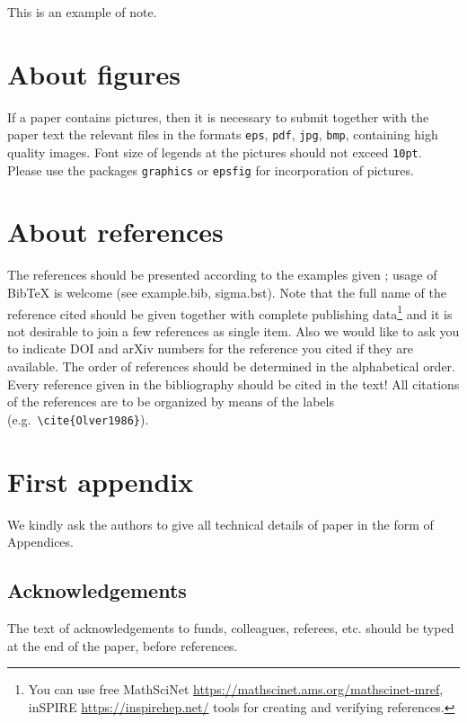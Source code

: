 \documentclass[pdftex]{sigma}
\numberwithin{equation}{section}
\begin{document}
\begin{Note}\label{note1}
This is an example of note.
\end{Note}


\section{About figures}

If a paper contains pictures, then it is necessary to submit together with
the paper text the relevant files in the formats {\tt eps}, {\tt pdf}, {\tt jpg}, {\tt bmp}, containing high quality images.
Font size of legends at the pictures should not exceed {\tt 10pt}.
Please use the packages  {\tt graphics} or {\tt epsfig} for incorporation of pictures.

\section{About references}

The references should be presented according to the examples given \cite{Calogero,Harrison2005,KajiwaraK/MasudaT/NoumiM/OhtaY/YamadaY:2006,Olver,Patera,Perelman,Witten};
usage of BibTeX is welcome (see example.bib, sigma.bst).
Note that the full name of the reference cited should be given together with
complete publishing data\footnote{You can use free MathSciNet \url{https://mathscinet.ams.org/mathscinet-mref}, inSPIRE \url{https://inspirehep.net/} tools for creating and verifying references.} and it is not desirable to join a few references as single item. Also we would like to ask you to indicate DOI and arXiv numbers for the reference you cited if they are available.
The order of references should be determined in the alphabetical order.
Every reference given in the bibliography should be cited in the text!
All citations of the references are to be organized by means of
the labels (e.g.~\verb_\cite{Olver1986}_).

\appendix

\section{First appendix}
We kindly ask the authors to give all technical details of paper in the form of Appendices.

\subsection*{Acknowledgements}

The text of acknowledgements to funds, colleagues, referees, etc. should be typed at the end of the paper, before references.



%
\end{document}
